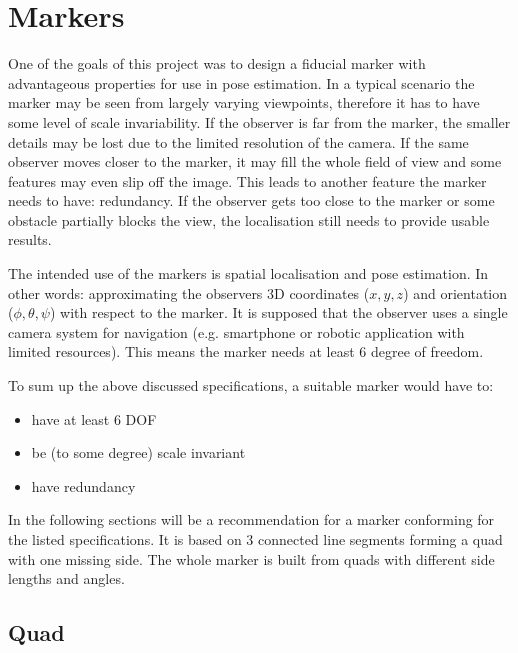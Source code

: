 \chapter{Markers}\label{sect:marker}

One of the goals of this project was to design a fiducial marker with advantageous properties for use in pose estimation.
In a typical scenario the marker may be seen from largely varying viewpoints, therefore it has to have some level of scale invariability.
If the observer is far from the marker, the smaller details may be lost due to the limited resolution of the camera.
If the same observer moves closer to the marker, it may fill the whole field of view and some features may even slip off the image.
This leads to another feature the marker needs to have: redundancy.
If the observer gets too close to the marker or some obstacle partially blocks the view, the localisation still needs to provide usable results.

The intended use of the markers is spatial localisation and pose estimation.
In other words: approximating the observers 3D coordinates ($x, y, z$) and orientation ($\phi, \theta, \psi$) with respect to the marker.
It is supposed that the observer uses a single camera system for navigation (e.g. smartphone or robotic application with limited resources).
This means the marker needs at least 6 degree of freedom.

To sum up the above discussed specifications, a suitable marker would have to:
\begin{itemize}
	\item have at least 6 DOF
	\item be (to some degree) scale invariant
	\item have redundancy
\end{itemize}

In the following sections will be a recommendation for a marker conforming for the listed specifications.
It is based on 3 connected line segments forming a quad with one missing side.
The whole marker is built from quads with different side lengths and angles.

\section{Quad}

